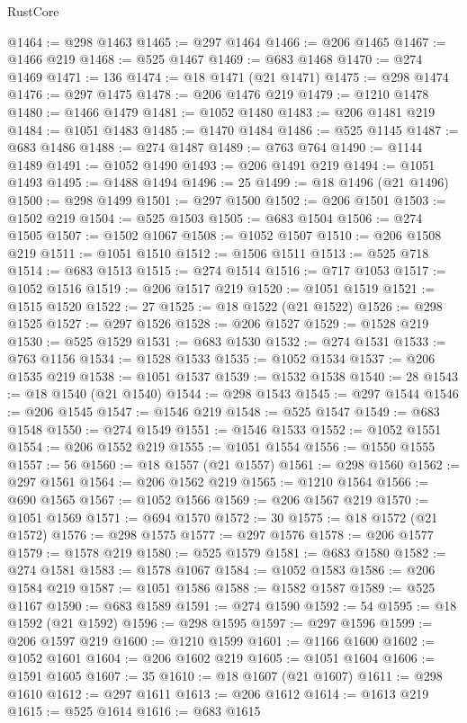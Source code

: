 \begin{lexlean}{RustCore}
\begin{coremodule}
@1464 := @298 @1463
@1465 := @297 @1464
@1466 := @206 @1465
@1467 := @1466 @219
@1468 := @525 @1467
@1469 := @683 @1468
@1470 := @274 @1469
@1471 := 136
@1474 := @18 @1471 (@21 @1471)
@1475 := @298 @1474
@1476 := @297 @1475
@1478 := @206 @1476 @219
@1479 := @1210 @1478
@1480 := @1466 @1479
@1481 := @1052 @1480
@1483 := @206 @1481 @219
@1484 := @1051 @1483
@1485 := @1470 @1484
@1486 := @525 @1145
@1487 := @683 @1486
@1488 := @274 @1487
@1489 := @763 @764
@1490 := @1144 @1489
@1491 := @1052 @1490
@1493 := @206 @1491 @219
@1494 := @1051 @1493
@1495 := @1488 @1494
@1496 := 25
@1499 := @18 @1496 (@21 @1496)
@1500 := @298 @1499
@1501 := @297 @1500
@1502 := @206 @1501
@1503 := @1502 @219
@1504 := @525 @1503
@1505 := @683 @1504
@1506 := @274 @1505
@1507 := @1502 @1067
@1508 := @1052 @1507
@1510 := @206 @1508 @219
@1511 := @1051 @1510
@1512 := @1506 @1511
@1513 := @525 @718
@1514 := @683 @1513
@1515 := @274 @1514
@1516 := @717 @1053
@1517 := @1052 @1516
@1519 := @206 @1517 @219
@1520 := @1051 @1519
@1521 := @1515 @1520
@1522 := 27
@1525 := @18 @1522 (@21 @1522)
@1526 := @298 @1525
@1527 := @297 @1526
@1528 := @206 @1527
@1529 := @1528 @219
@1530 := @525 @1529
@1531 := @683 @1530
@1532 := @274 @1531
@1533 := @763 @1156
@1534 := @1528 @1533
@1535 := @1052 @1534
@1537 := @206 @1535 @219
@1538 := @1051 @1537
@1539 := @1532 @1538
@1540 := 28
@1543 := @18 @1540 (@21 @1540)
@1544 := @298 @1543
@1545 := @297 @1544
@1546 := @206 @1545
@1547 := @1546 @219
@1548 := @525 @1547
@1549 := @683 @1548
@1550 := @274 @1549
@1551 := @1546 @1533
@1552 := @1052 @1551
@1554 := @206 @1552 @219
@1555 := @1051 @1554
@1556 := @1550 @1555
@1557 := 56
@1560 := @18 @1557 (@21 @1557)
@1561 := @298 @1560
@1562 := @297 @1561
@1564 := @206 @1562 @219
@1565 := @1210 @1564
@1566 := @690 @1565
@1567 := @1052 @1566
@1569 := @206 @1567 @219
@1570 := @1051 @1569
@1571 := @694 @1570
@1572 := 30
@1575 := @18 @1572 (@21 @1572)
@1576 := @298 @1575
@1577 := @297 @1576
@1578 := @206 @1577
@1579 := @1578 @219
@1580 := @525 @1579
@1581 := @683 @1580
@1582 := @274 @1581
@1583 := @1578 @1067
@1584 := @1052 @1583
@1586 := @206 @1584 @219
@1587 := @1051 @1586
@1588 := @1582 @1587
@1589 := @525 @1167
@1590 := @683 @1589
@1591 := @274 @1590
@1592 := 54
@1595 := @18 @1592 (@21 @1592)
@1596 := @298 @1595
@1597 := @297 @1596
@1599 := @206 @1597 @219
@1600 := @1210 @1599
@1601 := @1166 @1600
@1602 := @1052 @1601
@1604 := @206 @1602 @219
@1605 := @1051 @1604
@1606 := @1591 @1605
@1607 := 35
@1610 := @18 @1607 (@21 @1607)
@1611 := @298 @1610
@1612 := @297 @1611
@1613 := @206 @1612
@1614 := @1613 @219
@1615 := @525 @1614
@1616 := @683 @1615

\end{coremodule}
\end{lexlean}
